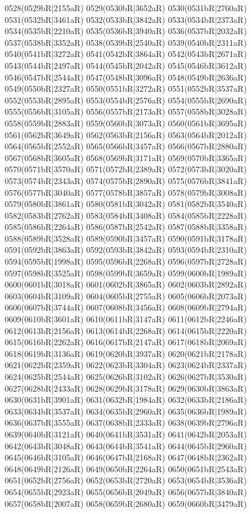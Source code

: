 0528(0529bR|2155aR) 0529(0530bR|3652aR) 0530(0531bR|2760aR) \\0531(0532bR|3461aR) 0532(0533bR|3842aR) 0533(0534bR|2373aR) 0534(0535bR|2210aR) 0535(0536bR|3940aR) 0536(0537bR|2032aR) 0537(0538bR|3352aR) 0538(0539bR|2540aR) 0539(0540bR|2311aR) \\0540(0541bR|3272aR) 0541(0542bR|3864aR) 0542(0543bR|2671aR) 0543(0544bR|2497aR) 0544(0545bR|2042aR) 0545(0546bR|3612aR) 0546(0547bR|2544aR) 0547(0548bR|3096aR) 0548(0549bR|2636aR) \\0549(0550bR|2327aR) 0550(0551bR|3272aR) 0551(0552bR|3537aR) 0552(0553bR|2895aR) 0553(0554bR|2576aR) 0554(0555bR|2690aR) 0555(0556bR|3105aR) 0556(0557bR|2173aR) 0557(0558bR|3028aR) \\0558(0559bR|2883aR) 0559(0560bR|3073aR) 0560(0561bR|3695aR) 0561(0562bR|3649aR) 0562(0563bR|2156aR) 0563(0564bR|2012aR) 0564(0565bR|2552aR) 0565(0566bR|3457aR) 0566(0567bR|2880aR) \\0567(0568bR|3605aR) 0568(0569bR|3171aR) 0569(0570bR|3365aR) 0570(0571bR|3570aR) 0571(0572bR|2389aR) 0572(0573bR|3020aR) 0573(0574bR|2343aR) 0574(0575bR|2890aR) 0575(0576bR|3841aR) \\0576(0577bR|3040aR) 0577(0578bR|3857aR) 0578(0579bR|3008aR) 0579(0580bR|3861aR) 0580(0581bR|3042aR) 0581(0582bR|3540aR) 0582(0583bR|2762aR) 0583(0584bR|3408aR) 0584(0585bR|2228aR) \\0585(0586bR|2264aR) 0586(0587bR|2542aR) 0587(0588bR|3358aR) 0588(0589bR|3528aR) 0589(0590bR|3457aR) 0590(0591bR|3178aR) 0591(0592bR|3863aR) 0592(0593bR|3842aR) 0593(0594bR|2310aR) \\0594(0595bR|1998aR) 0595(0596bR|2268aR) 0596(0597bR|2728aR) 0597(0598bR|3525aR) 0598(0599bR|3659aR) 0599(0600bR|1989aR) 0600(0601bR|3018aR) 0601(0602bR|3865aR) 0602(0603bR|2892aR) \\0603(0604bR|3109aR) 0604(0605bR|2755aR) 0605(0606bR|2073aR) 0606(0607bR|3744aR) 0607(0608bR|3456aR) 0608(0609bR|2794aR) 0609(0610bR|3601aR) 0610(0611bR|3147aR) 0611(0612bR|2246aR) \\0612(0613bR|2156aR) 0613(0614bR|2268aR) 0614(0615bR|2220aR) 0615(0616bR|2262aR) 0616(0617bR|2147aR) 0617(0618bR|2069aR) 0618(0619bR|3136aR) 0619(0620bR|3937aR) 0620(0621bR|2178aR) \\0621(0622bR|2359aR) 0622(0623bR|3304aR) 0623(0624bR|2337aR) 0624(0625bR|2544aR) 0625(0626bR|3102aR) 0626(0627bR|3530aR) 0627(0628bR|2433aR) 0628(0629bR|3178aR) 0629(0630bR|3863aR) \\0630(0631bR|3901aR) 0631(0632bR|1984aR) 0632(0633bR|2186aR) 0633(0634bR|3537aR) 0634(0635bR|2960aR) 0635(0636bR|1989aR) 0636(0637bR|3555aR) 0637(0638bR|2333aR) 0638(0639bR|2796aR) \\0639(0640bR|3121aR) 0640(0641bR|3531aR) 0641(0642bR|2053aR) 0642(0643bR|3048aR) 0643(0644bR|3541aR) 0644(0645bR|2960aR) 0645(0646bR|3105aR) 0646(0647bR|2168aR) 0647(0648bR|2362aR) \\0648(0649bR|2126aR) 0649(0650bR|2264aR) 0650(0651bR|2543aR) 0651(0652bR|2756aR) 0652(0653bR|2720aR) 0653(0654bR|3536aR) 0654(0655bR|2923aR) 0655(0656bR|2049aR) 0656(0657bR|3840aR) \\0657(0658bR|2007aR) 0658(0659bR|2680aR) 0659(0660bR|3479aR) 